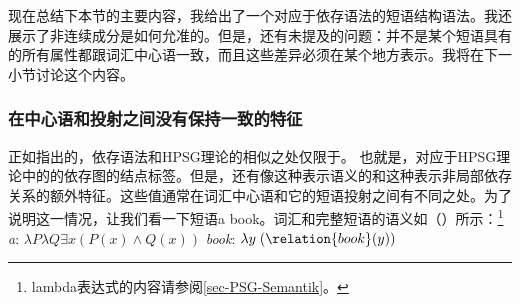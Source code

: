 现在总结下本节的主要内容，我给出了一个对应于依存语法的短语结构语法。我还展示了非连续成分是如何允准的。但是，还有未提及的问题：并不是某个短语具有的所有属性都跟词汇中心语一致，而且这些差异必须在某个地方表示。我将在下一小节讨论这个内容。

\subsubsection{在中心语和投射之间没有保持一致的特征}
\label{sec-dg-daughters-mothers}
\label{sec-dg-is-simpler}
%
正如\citet{Oliva2003a}指出的，依存语法和HPSG理论的相似之处仅限于\headvsc。
也就是，对应于HPSG理论中的\headvsc 的依存图的结点标签。但是，还有像\contc 这种表示语义的和\slaschc 这种表示非局部依存关系的额外特征。这些值通常在词汇中心语和它的短语投射之间有不同之处。为了说明这一情况，让我们看一下短语a book。词汇和完整短语的语义如（）所示：\footnote{lambda表达式的内容请参阅\ref{sec-PSG-Semantik}。}
\eal
\ex \emph{a}: $\lambda P \lambda Q \exists x (P(x) \wedge Q(x))$
\ex \emph{book}: $\lambda y\;(\relation{book}(y))$
